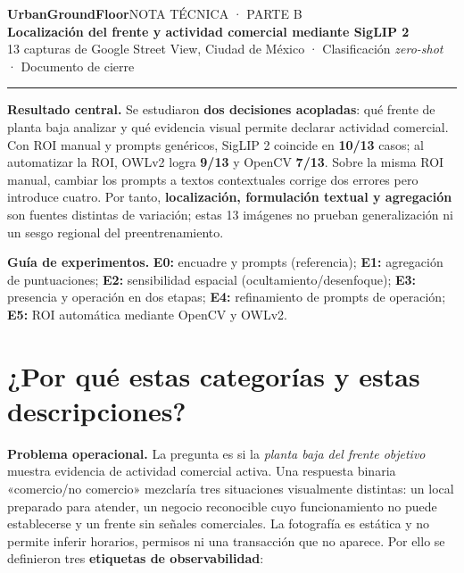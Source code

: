 \documentclass[10pt,a4paper]{article}
\begin{document}
{\color{navy}\LARGE\bfseries UrbanGroundFloor}\hfill{\color{teal}\small NOTA TÉCNICA · PARTE B}\\[-1pt]
{\large\bfseries Localización del frente y actividad comercial mediante SigLIP 2}\\[3pt]
{\small\color{muted}13 capturas de Google Street View, Ciudad de México · Clasificación \emph{zero-shot} · Documento de cierre}
\vspace{3pt}\hrule\vspace{7pt}

\colorbox{light}{\parbox{\dimexpr\linewidth-2\fboxsep\relax}{\textbf{Resultado central.} Se estudiaron \textbf{dos decisiones acopladas}: qué frente de planta baja analizar y qué evidencia visual permite declarar actividad comercial. Con ROI manual y prompts genéricos, SigLIP 2 coincide en \textbf{10/13} casos; al automatizar la ROI, OWLv2 logra \textbf{9/13} y OpenCV \textbf{7/13}. Sobre la misma ROI manual, cambiar los prompts a textos contextuales corrige dos errores pero introduce cuatro. Por tanto, \textbf{localización, formulación textual y agregación} son fuentes distintas de variación; estas 13 imágenes no prueban generalización ni un sesgo regional del preentrenamiento.}}


\vspace{4pt}
{\footnotesize\textbf{Guía de experimentos.} \textbf{E0:} encuadre y prompts (referencia); \textbf{E1:} agregación de puntuaciones; \textbf{E2:} sensibilidad espacial (ocultamiento/desenfoque); \textbf{E3:} presencia y operación en dos etapas; \textbf{E4:} refinamiento de prompts de operación; \textbf{E5:} ROI automática mediante OpenCV y OWLv2.}\par
\vspace{2pt}

\section{¿Por qué estas categorías y estas descripciones?}

\textbf{Problema operacional.} La pregunta es si la \emph{planta baja del frente objetivo} muestra evidencia de actividad comercial activa. Una respuesta binaria «comercio/no comercio» mezclaría tres situaciones visualmente distintas: un local preparado para atender, un negocio reconocible cuyo funcionamiento no puede establecerse y un frente sin señales comerciales. La fotografía es estática y no permite inferir horarios, permisos ni una transacción que no aparece. Por ello se definieron tres \textbf{etiquetas de observabilidad}:
\end{document}
